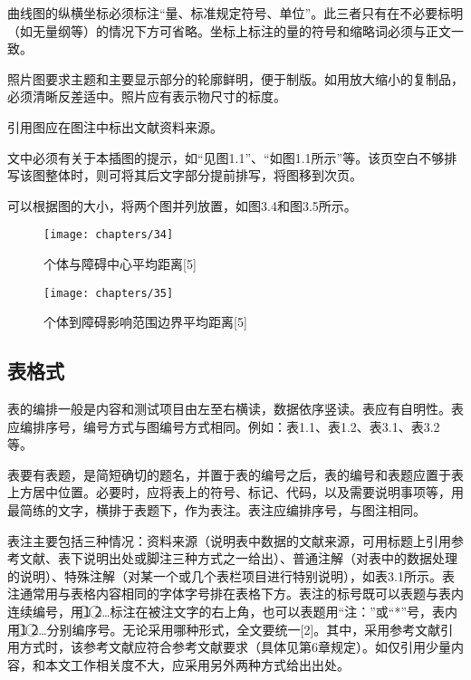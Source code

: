 曲线图的纵横坐标必须标注“量、标准规定符号、单位”。此三者只有在不必要标明（如无量纲等）的情况下方可省略。坐标上标注的量的符号和缩略词必须与正文一致。

照片图要求主题和主要显示部分的轮廓鲜明，便于制版。如用放大缩小的复制品，必须清晰反差适中。照片应有表示物尺寸的标度。

引用图应在图注中标出文献资料来源。

文中必须有关于本插图的提示，如“见图1.1”、“如图1.1所示”等。该页空白不够排写该图整体时，则可将其后文字部分提前排写，将图移到次页。

可以根据图的大小，将两个图并列放置，如图3.4和图3.5所示。


\begin{figure} 
	\begin{minipage}[t]{0.45\linewidth} 
		\centering 
		\texttt{[image: chapters/34]} 
		\caption{个体与障碍中心平均距离[5]} 
		\label{fig:side:a} 
	\end{minipage}%
	\begin{minipage}[t]{0.6\linewidth} 
		\centering 
		\texttt{[image: chapters/35]} 
		\caption{个体到障碍影响范围边界平均距离[5]} 
		\label{fig:side:b} 
	\end{minipage} 
\end{figure}


\subsection{表格式}
表的编排一般是内容和测试项目由左至右横读，数据依序竖读。表应有自明性。表应编排序号，编号方式与图编号方式相同。例如：表1.1、表1.2、表3.1、表3.2等。

表要有表题，是简短确切的题名，并置于表的编号之后，表的编号和表题应置于表上方居中位置。必要时，应将表上的符号、标记、代码，以及需要说明事项等，用最简练的文字，横排于表题下，作为表注。表注应编排序号，与图注相同。

表注主要包括三种情况：资料来源（说明表中数据的文献来源，可用标题上引用参考文献、表下说明出处或脚注三种方式之一给出）、普通注解（对表中的数据处理的说明）、特殊注解（对某一个或几个表栏项目进行特别说明），如表3.1所示。表注通常用与表格内容相同的字体字号排在表格下方。表注的标号既可以表题与表内连续编号，用\textcircled{1} \textcircled{2}…标注在被注文字的右上角，也可以表题用“注：”或“*”号，表内用\textcircled{1} \textcircled{2}…分别编序号。无论采用哪种形式，全文要统一[2]。其中，采用参考文献引用方式时，该参考文献应符合参考文献要求（具体见第6章规定）。如仅引用少量内容，和本文工作相关度不大，应采用另外两种方式给出出处。


